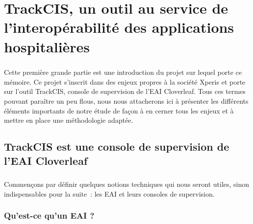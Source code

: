 \chapter{TrackCIS, un outil au service de l'interopérabilité des applications
hospitalières}
	\paragraph{}
	Cette première grande partie est une introduction du projet sur lequel porte ce
	mémoire. Ce projet s'inscrit dans des enjeux propres à la société Xperis et
	porte sur l'outil TrackCIS, console de supervision de l'EAI Cloverleaf. Tous
	ces termes pouvant paraître un peu flous, nous nous attacherons ici à présenter
	les différents éléments importants de notre étude de façon à en cerner tous
	les enjeux et à mettre en place une méthodologie adaptée.

	\section{TrackCIS est une console de supervision de l'EAI Cloverleaf}
		\paragraph{}
		Commençons par définir quelques notions techniques qui nous seront utiles,
		sinon indispensables pour la suite~: les EAI et leurs consoles de supervision.
		
		\subsection{Qu'est-ce qu'un EAI ?}
